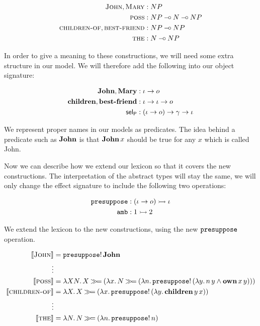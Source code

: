 \begin{align*}
  \textsc{John}, \textsc{Mary} &: NP \\
  \textsc{poss} &: NP \mathbin{{-}\mkern-3.5mu{\circ}} N \mathbin{{-}\mkern-3.5mu{\circ}} NP \\
  \textsc{children-of}, \textsc{best-friend} &: NP \mathbin{{-}\mkern-3.5mu{\circ}} NP \\
  \textsc{the} &: N \mathbin{{-}\mkern-3.5mu{\circ}} NP
\end{align*}

In order to give a meaning to these constructions, we will need some extra
structure in our model. We will therefore add the following into our
object signature:

\begin{align*}
  \textbf{John}, \textbf{Mary} &: \iota \to o \\
  \textbf{children}, \textbf{best-friend} &: \iota \to \iota \to o \\
  \mathsf{sel}_{\mathsf{P}} &: (\iota \to o) \to \gamma \to \iota
\end{align*}

We represent proper names in our models as predicates. The idea behind a
predicate such as $\textbf{John}$ is that $\textbf{John}\,x$ should be true
for any $x$ which is called John.

Now we can describe how we extend our lexicon so that it covers the new
constructions. The interpretation of the abstract types will stay the same,
we will only change the effect signature to include the following two
operations:

\begin{align*}
\mathtt{presuppose} &: (\iota \to o) \rightarrowtail \iota \\
\mathtt{amb} &: 1 \rightarrowtail 2
\end{align*}

We extend the lexicon to the new constructions, using the new
$\mathtt{presuppose}$ operation.

\begin{align*}
  \llbracket \textsc{John} \rrbracket &= \mathtt{presuppose}!\,\textbf{John} \\
  \vdots \\
  \llbracket \textsc{poss} \rrbracket &= \lambda X N.\, X \mathbin{\gg\!=} (\lambda x.\, N \mathbin{\gg\!=} (\lambda n.\, \mathtt{presuppose}!\,(\lambda y.\, n\,y \land \textbf{own}\,x\,y))) \\
  \llbracket \textsc{children-of} \rrbracket &= \lambda X.\, X \mathbin{\gg\!=} (\lambda x.\, \mathtt{presuppose}!\,(\lambda y.\, \textbf{children}\,y\,x)) \\
  \vdots \\
  \llbracket \textsc{the} \rrbracket &= \lambda N.\, N \mathbin{\gg\!=} (\lambda n.\, \mathtt{presuppose}!\,n)
\end{align*}

